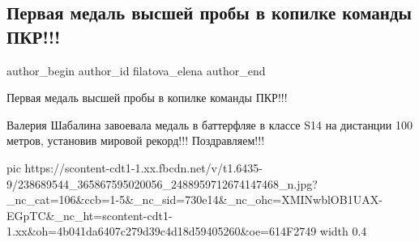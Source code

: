  
 
 
 
 
 
\subsection{Первая медаль высшей пробы в копилке команды ПКР!!!}
\label{sec:25_08_2021.fb.filatova_elena.1.medal_pkr_rossia}
 
\ifcmt
 author_begin
   author_id filatova_elena
 author_end
\fi

Первая медаль высшей пробы в копилке команды ПКР!!!

Валерия Шабалина завоевала медаль в баттерфляе в классе S14 на дистанции 100
метров, установив мировой рекорд!!! Поздравляем!!!

\ifcmt
  pic https://scontent-cdt1-1.xx.fbcdn.net/v/t1.6435-9/238689544_365867595020056_2488959712674147468_n.jpg?_nc_cat=106&ccb=1-5&_nc_sid=730e14&_nc_ohc=XMINwblOB1UAX-EGpTC&_nc_ht=scontent-cdt1-1.xx&oh=4b041da6407c279d39c4d18d59405260&oe=614F2749
  width 0.4
\fi
